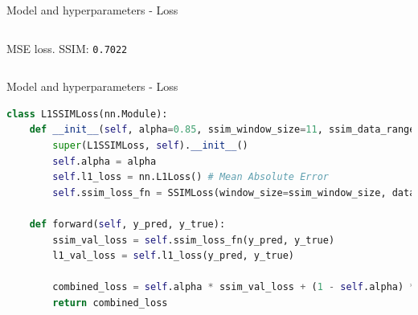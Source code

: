 \documentclass[8pt]{beamer}
\begin{document}
\begin{frame}{Model and hyperparameters - Loss}
\begin{columns}
            \newline
            \centering \small MSE loss. SSIM: \texttt{0.7022}
    \end{columns}
\end{frame}

\begin{frame}[fragile]{Model and hyperparameters - Loss}
    \begin{lstlisting}[language=python]
class L1SSIMLoss(nn.Module):
    def __init__(self, alpha=0.85, ssim_window_size=11, ssim_data_range=1.0, ssim_channel=1):
        super(L1SSIMLoss, self).__init__()
        self.alpha = alpha
        self.l1_loss = nn.L1Loss() # Mean Absolute Error
        self.ssim_loss_fn = SSIMLoss(window_size=ssim_window_size, data_range=ssim_data_range, channel=ssim_channel)

    def forward(self, y_pred, y_true):
        ssim_val_loss = self.ssim_loss_fn(y_pred, y_true)
        l1_val_loss = self.l1_loss(y_pred, y_true)
        
        combined_loss = self.alpha * ssim_val_loss + (1 - self.alpha) * l1_val_loss
        return combined_loss
    \end{lstlisting}
\end{frame}
\end{document}

